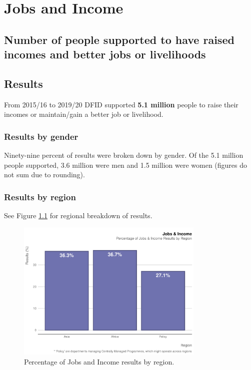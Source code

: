 \chapter{Jobs and Income}

\section*{Number of people supported to have raised incomes and better jobs  or livelihoods}

\thispagestyle{empty}


\section{Results}
From 2015/16 to 2019/20 DFID supported \textbf{5.1 million} people to raise their incomes or maintain/gain a better job or livelihood. %

\subsection{Results by gender}
Ninety-nine percent of results were broken down by gender. %
Of the 5.1 million people supported, 3.6 million were men and 1.5 million were women (figures do not sum due to rounding).

\subsection{Results by region}
See Figure \ref{fig:jobs_region_plot} for regional breakdown of results.  %


\begin{figure}[htbp]
	\centering
	\includegraphics[width=0.8\textwidth]{../figs/jobs_region_plot} \hfill
	\caption{Percentage of Jobs and Income results by region.}
	\label{fig:jobs_region_plot}
\end{figure}



